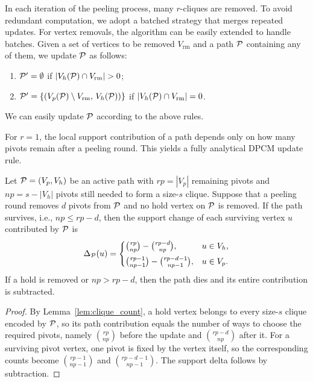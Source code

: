 In each iteration of the peeling process, many $r$-cliques are removed. 
To avoid redundant computation, we adopt a batched strategy that merges repeated updates. 
For vertex removals, the algorithm can be easily extended to handle batches. 
Given a set of vertices to be removed $V_{\mathrm{rm}}$ and a path $\TPath$ containing any of them, we update $\TPath$ as follows:
\begin{enumerate}[leftmargin=*]
    \item $\TPath' = \emptyset$ if $|V_h(\TPath) \cap V_{\mathrm{rm}}| > 0$;
    \item $\TPath' = \{(V_p(\TPath) \setminus V_{\mathrm{rm}},\, V_h(\TPath))\}$ if $|V_h(\TPath) \cap V_{\mathrm{rm}}| = 0$.
\end{enumerate}
We can easily update $\TPath$ according to the above rules.

For $r{=}1$, the local support contribution of a path depends only on how many pivots remain after a peeling round.
%
This yields a fully analytical DPCM update rule.

\begin{theorem}[Closed-Form Support Delta for $r=1$]\label{thm:r1_delta}
Let $\TPath=(V_p,V_h)$ be an active path with $\mathit{rp}=|V_p|$ remaining pivots and $\mathit{np}=s-|V_h|$ pivots still needed to form a size-$s$ clique.
Suppose that a peeling round removes $d$ pivots from $\TPath$ and no hold vertex on $\TPath$ is removed.
If the path survives, i.e., $\mathit{np}\le \mathit{rp}-d$, then the support change of each surviving vertex $u$ contributed by $\TPath$ is
\[
\Delta_{\TPath}(u)=
\begin{cases}
\binom{\mathit{rp}}{\mathit{np}}-\binom{\mathit{rp}-d}{\mathit{np}}, & u\in V_h,\\[4pt]
\binom{\mathit{rp}-1}{\mathit{np}-1}-\binom{\mathit{rp}-d-1}{\mathit{np}-1}, & u\in V_p.
\end{cases}
\]
If a hold is removed or $\mathit{np}>\mathit{rp}-d$, then the path dies and its entire contribution is subtracted.
\end{theorem}

\begin{proof}
By Lemma~\ref{lem:clique_count}, a hold vertex belongs to every size-$s$ clique encoded by $\TPath$, so its path contribution equals the number of ways to choose the required pivots, namely $\binom{\mathit{rp}}{\mathit{np}}$ before the update and $\binom{\mathit{rp}-d}{\mathit{np}}$ after it.
%
For a surviving pivot vertex, one pivot is fixed by the vertex itself, so the corresponding counts become $\binom{\mathit{rp}-1}{\mathit{np}-1}$ and $\binom{\mathit{rp}-d-1}{\mathit{np}-1}$.
%
The support delta follows by subtraction.
\end{proof}

